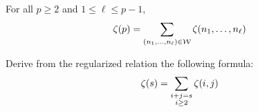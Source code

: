 \begin{thm}
For all $p \geq 2$ and $1 \leq \ell \leq p-1$,
\[
\zeta(p) = \sum_{(n_1, \ldots, n_{\ell}) \in \mathcal{W}} \zeta(n_1, \ldots, n_{\ell})
\]
\end{thm}

\begin{xca}
Derive from the regularized relation the following formula:
\[
\zeta(s) = \sum_{\begin{subarray}{c}
i+j=s \\
i\geq2
\end{subarray}}
\zeta(i,j)
\]
\end{xca}


